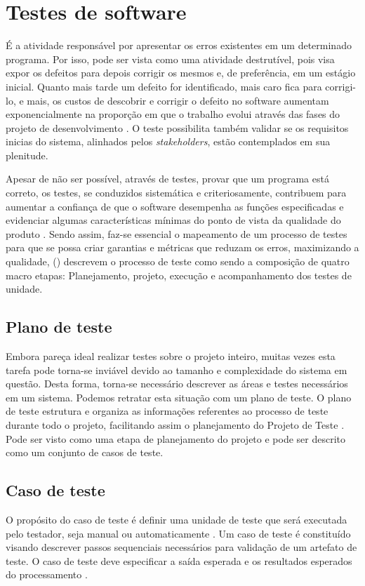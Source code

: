 \documentclass[tg]{mdtufsm}
\begin{document}
\section{Testes de software}
É a atividade responsável por apresentar os erros existentes em um determinado programa. Por isso, pode ser vista como uma atividade destrutível, pois visa expor os defeitos para depois corrigir os mesmos e, de preferência, em
um estágio inicial. Quanto mais tarde um defeito for identificado, mais caro fica para corrigi-lo, e mais, os custos de descobrir e corrigir o defeito no software aumentam exponencialmente na proporção em que o trabalho
evolui através das fases do projeto de desenvolvimento \cite{boehm1976quantitative}. O teste possibilita também validar se os requisitos inicias do sistema, alinhados pelos \emph{stakeholders}, estão contemplados em sua plenitude.

Apesar de não ser possível, através de testes, provar que um programa está correto, os testes, se conduzidos sistemática e criteriosamente, contribuem para
aumentar a confiança de que o software desempenha as funções especificadas e evidenciar algumas características mínimas do ponto de vista da qualidade do produto \cite{maldonado2004introduccao}. Sendo assim,
faz-se essencial o mapeamento de um processo de testes para que se possa criar garantias e métricas que reduzam os erros, maximizando a qualidade, \citeauthor{crespo2004metodologia} (\citeyear{crespo2004metodologia}) descrevem o processo de
teste como sendo a composição de quatro macro etapas: Planejamento, projeto, execução e acompanhamento dos testes de unidade.

\subsection{Plano de teste}
Embora pareça ideal realizar testes sobre o projeto inteiro, muitas vezes esta tarefa pode torna-se inviável devido ao tamanho e complexidade do sistema em questão. Desta forma, torna-se necessário descrever as áreas e testes necessários em um sistema. Podemos retratar esta situação com um plano de teste.
O plano de teste estrutura e organiza as informações referentes  ao  processo  de  teste  durante  todo  o  projeto,  facilitando assim  o  planejamento  do  
Projeto  de  Teste \cite{piqueiro2015}. Pode ser visto como uma etapa de planejamento do projeto e pode ser descrito como um conjunto de casos de teste.

\subsection{Caso de teste}
O propósito do caso de teste é definir uma unidade de teste que será executada pelo testador, seja manual ou automaticamente \cite{rios2006teste}. Um caso de teste é constituído visando descrever passos sequenciais necessários para validação de um artefato de teste. O caso de teste deve especificar a saída esperada e os resultados esperados do processamento \cite{myers2011art}.
\end{document}
